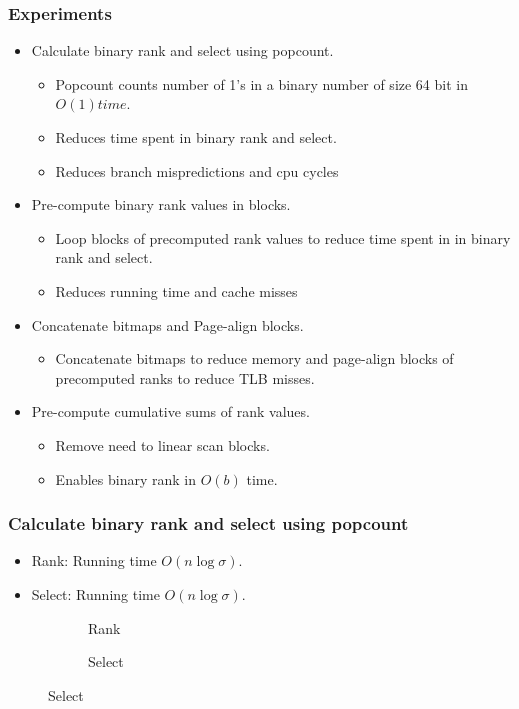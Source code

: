 \documentclass{beamer}
\begin{document}
\begin{frame}
\frametitle{Experiments}
\begin{itemize}
\setlength\itemsep{1em}
\item Calculate binary rank and select using popcount.
	\begin{itemize}
	\item Popcount counts number of 1's in a binary number of size 64 bit in $O(1) time$.
	\item Reduces time spent in binary rank and select.
	\item Reduces branch mispredictions and cpu cycles
	\end{itemize}
\item Pre-compute binary rank values in blocks.
	\begin{itemize}
	\item Loop blocks of precomputed rank values to reduce time spent in in binary rank and select.
	\item Reduces running time and cache misses
	\end{itemize}
\item Concatenate bitmaps and Page-align blocks.
	\begin{itemize}
	\item Concatenate bitmaps to reduce memory and page-align blocks of precomputed ranks to reduce TLB misses.
	\end{itemize}
\item Pre-compute cumulative sums of rank values.
	\begin{itemize}
	\item Remove need to linear scan blocks.
	\item Enables binary rank in $O(b)$ time.
	\end{itemize}
\end{itemize}
\end{frame}



\begin{frame}
\frametitle{Calculate binary rank and select using popcount}
\begin{itemize}
\item Rank: Running time $O(n \log \sigma)$.
\item Select: Running time $O(n \log \sigma)$.
\end{itemize}
\begin{figure}[h!]\tiny
	\begin{subfigure}{\textwidth}
		\center \scalebox{.6}{}
		\caption{\tiny{Rank}}
	\end{subfigure}
	\begin{subfigure}{\textwidth}
		\center \scalebox{.6}{}
		\caption{\tiny{Select}}
	\end{subfigure}
\end{figure}
\end{frame}
\end{document}
